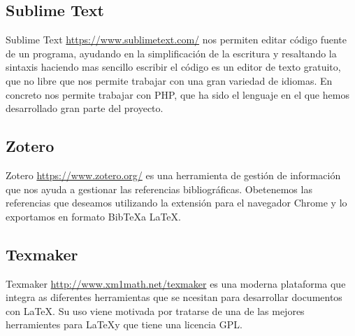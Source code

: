 \subsection{Sublime Text}

Sublime Text \url{https://www.sublimetext.com/} nos permiten editar código fuente de un programa, ayudando en la simplificación de la escritura y resaltando la sintaxis haciendo mas sencillo escribir el código es un editor de texto gratuito, que no libre que nos permite trabajar con una gran variedad de idiomas. En concreto nos permite trabajar con PHP, que ha sido el lenguaje en el que hemos desarrollado gran parte del proyecto.

\subsection{Zotero}

Zotero \url{https://www.zotero.org/} es una herramienta de gestión de información que  nos ayuda a gestionar las referencias bibliográficas. Obetenemos las referencias que deseamos utilizando la extensión para el navegador Chrome y lo exportamos en formato Bib\TeX a \LaTeX.

\subsection{Texmaker}

Texmaker \url{http://www.xm1math.net/texmaker} es una moderna plataforma que integra as diferentes herramientas que se ncesitan para desarrollar documentos con \LaTeX. Su uso viene motivada por tratarse de una de las mejores herramientes para \LaTeX y que tiene una licencia GPL.
